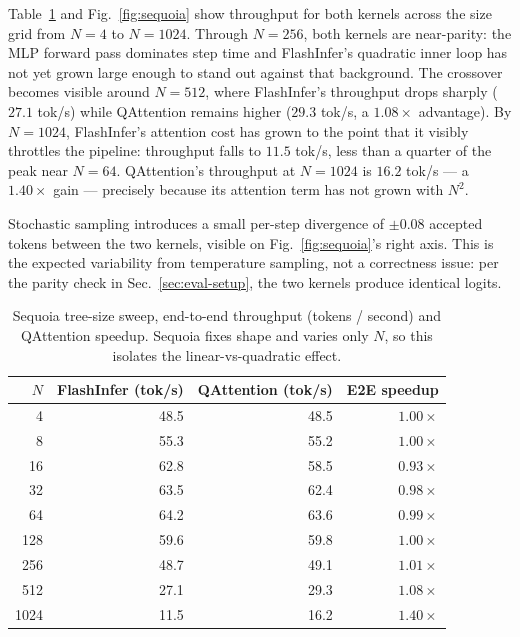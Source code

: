 \documentclass{article}
\newcommand{\method}{QAttention}
\newcommand{\numtokens}{N}
\begin{document}
Table~\ref{tab:sequoia} and Fig.~\ref{fig:sequoia} show throughput
for both kernels across the size grid from $\numtokens{=}4$ to
$\numtokens{=}1024$. Through $\numtokens{=}256$, both kernels are
near-parity: the MLP forward pass dominates step time and FlashInfer's
quadratic inner loop has not yet grown large enough to stand out against
that background. The crossover becomes visible around $\numtokens{=}512$,
where FlashInfer's throughput drops sharply ($27.1$ tok/s) while
\method{} remains higher ($29.3$ tok/s, a $1.08\times$ advantage).
By $\numtokens{=}1024$, FlashInfer's attention cost has grown to the
point that it visibly throttles the pipeline: throughput falls to
$11.5$ tok/s, less than a quarter of the peak near $\numtokens{=}64$.
\method{}'s throughput at $\numtokens{=}1024$ is $16.2$ tok/s ---
a $\boldsymbol{1.40\times}$ gain --- precisely because its attention
term has not grown with $\numtokens^2$.

Stochastic sampling introduces a small per-step divergence of
$\pm 0.08$ accepted tokens between the two kernels, visible on
Fig.~\ref{fig:sequoia}'s right axis. This is the expected
variability from temperature sampling, not a correctness issue:
per the parity check in Sec.~\ref{sec:eval-setup}, the two kernels
produce identical logits.

\begin{table}[!htbp]
\centering
\caption{Sequoia tree-size sweep, end-to-end throughput
(tokens / second) and \method{} speedup. Sequoia fixes shape
and varies only $\numtokens$, so this isolates the
linear-vs-quadratic effect.}
\label{tab:sequoia}
\small
\begin{tabular}{r rr r}
\toprule
$\numtokens$ & FlashInfer (tok/s) & \method{} (tok/s) & E2E speedup \\
\midrule
   4 & 48.5  & 48.5  & $1.00\times$ \\
   8 & 55.3  & 55.2  & $1.00\times$ \\
  16 & 62.8  & 58.5  & $0.93\times$ \\
  32 & 63.5  & 62.4  & $0.98\times$ \\
  64 & 64.2  & 63.6  & $0.99\times$ \\
 128 & 59.6  & 59.8  & $1.00\times$ \\
 256 & 48.7  & 49.1  & $1.01\times$ \\
 512 & 27.1  & 29.3  & $1.08\times$ \\
1024 & 11.5  & 16.2  & $\boldsymbol{1.40\times}$ \\
\bottomrule
\end{tabular}
\end{table}
\end{document}
